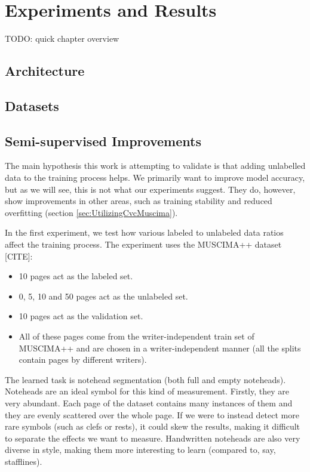 \chapter{Experiments and Results}
\label{chap:ExperimentsAndResults}

TODO: quick chapter overview



\section{Architecture}
\label{sec:Architecture}


\section{Datasets}
\label{sec:Datasets}


\section{Semi-supervised Improvements}
\label{sec:SemisupervisedImprovements}

The main hypothesis this work is attempting to validate is that adding unlabelled data to the training process helps. We primarily want to improve model accuracy, but as we will see, this is not what our experiments suggest. They do, however, show improvements in other areas, such as training stability and reduced overfitting (section \ref{sec:UtilizingCvcMuscima}).

In the first experiment, we test how various labeled to unlabeled data ratios affect the training process. The experiment uses the MUSCIMA++ dataset [CITE]:

\begin{itemize}
    \item 10 pages act as the labeled set.
    \item 0, 5, 10 and 50 pages act as the unlabeled set.
    \item 10 pages act as the validation set.
    \item All of these pages come from the writer-independent train set of MUSCIMA++ and are chosen in a writer-independent manner (all the splits contain pages by different writers).
\end{itemize}

The learned task is notehead segmentation (both full and empty noteheads). Noteheads are an ideal symbol for this kind of measurement. Firstly, they are very abundant. Each page of the dataset contains many instances of them and they are evenly scattered over the whole page. If we were to instead detect more rare symbols (such as clefs or rests), it could skew the results, making it difficult to separate the effects we want to measure. Handwritten noteheads are also very diverse in style, making them more interesting to learn (compared to, say, stafflines).

